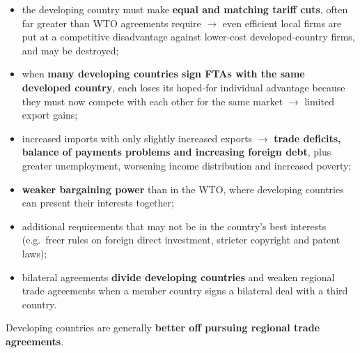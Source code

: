 \begin{itemize}
  \begin{itemize}
    \item the developing country must make \textbf{equal and matching tariff cuts}, often far greater than WTO agreements require $\to$ even efficient local firms are put at a competitive disadvantage against lower-cost developed-country firms, and may be destroyed;
    \item when \textbf{many developing countries sign FTAs with the same developed country}, each loses its hoped-for individual advantage because they must now compete with each other for the same market $\to$ limited export gains;
    \item increased imports with only slightly increased exports $\to$ \textbf{trade deficits, balance of payments problems and increasing foreign debt}, plus greater unemployment, worsening income distribution and increased poverty;
    \item \textbf{weaker bargaining power} than in the WTO, where developing countries can present their interests together;
    \item additional requirements that may not be in the country's best interests (e.g.\ freer rules on foreign direct investment, stricter copyright and patent laws);
    \item bilateral agreements \textbf{divide developing countries} and weaken regional trade agreements when a member country signs a bilateral deal with a third country.
  \end{itemize}
  Developing countries are generally \textbf{better off pursuing regional trade agreements}. 
\end{itemize}

